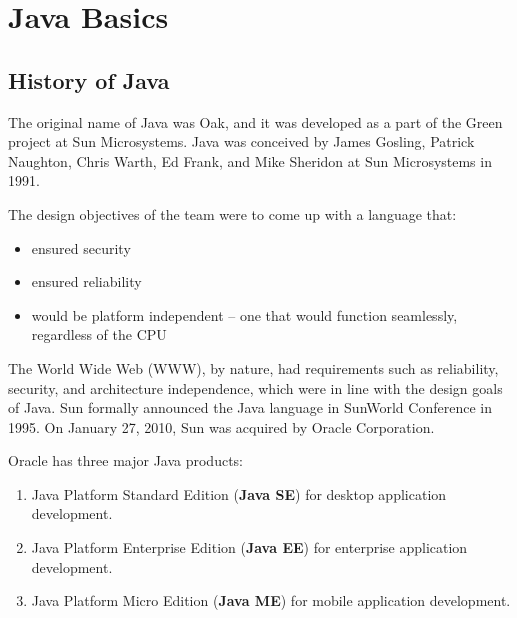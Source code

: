 \documentclass[11pt,a4paper]{article}
\author{TalentSprint}
\date{}
\begin{document}
\section*{Java Basics}
\subsection*{History of Java}
The original name of Java was Oak, and it was developed as a part of the Green project at Sun Microsystems. Java was conceived by James Gosling, Patrick Naughton, Chris Warth, Ed Frank, and Mike Sheridon at Sun Microsystems in 1991.

The design objectives of the team were to come up with a language that:
\begin{itemize}
\item ensured security
\item ensured reliability
\item would be platform independent -- one that would function seamlessly, regardless of the CPU
\end{itemize}
The World Wide Web (WWW), by nature, had requirements such as reliability, security, and architecture independence, which were in line with the design goals of Java. Sun formally announced the Java language in SunWorld Conference in 1995.
On January 27, 2010, Sun was acquired by Oracle Corporation.

Oracle has three major Java products: 
\begin{enumerate}
 \item Java Platform Standard Edition (\textbf{Java SE}) for desktop application development.
 \item Java Platform Enterprise Edition (\textbf{Java EE}) for enterprise application development.
 \item Java Platform Micro Edition (\textbf{Java ME}) for mobile application development.
\end{enumerate}

\end{document}

